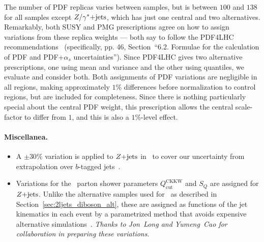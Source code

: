 The number of PDF replicas varies between samples, but is between
$100$ and $138$ for all samples except $Z/\gamma^*\mathrm{+jets}$, which has just one central
and two alternatives.
Remarkably, both SUSY and PMG prescriptions agree on how to assign variations
from these replica weights --- both say to follow the PDF4LHC
recommendations~\cite{PDF4LHC_Butterworth_2016} (specifically, pp. 46,
Section~``6.2. Formulae for the calculation of PDF and PDF+$\alpha_s$
uncertainties'').
Since PDF4LHC gives two alternative prescriptions, one using mean and variance
and the other using quantiles, we evaluate and consider both.
Both assignments of PDF variations are negligible in all regions, making
approximately $1\%$ differences before normalization to control regions, but are
included for completeness.
Since there is nothing particularly special about the central PDF weight,
this prescription allows the central scale-factor to differ from $1$,
and this is also a $1\%$-level effect.

\paragraph{Miscellanea.}
\begin{itemize}
\item A $\pm30\%$ variation is applied to $Z\mathrm{+jets}$ in \crtt\ to cover our
uncertainty from extrapolation over $b$-tagged
jets~\cite{atlas_twiki_susytheoretical}.
\item Variations for the \sherpa\ parton shower parameters
$Q_\textrm{cut}^\textrm{CKKW}$ and
$S_Q$ are assigned for $Z\mathrm{+jets}$.
Unlike the alternative samples used for \diboson\ as described in
Section~\ref{sec:2ljets_diboson_alt}, these are assigned as functions of the
jet kinematics in each event by a parametrized method that avoids expensive
alternative simulations~\cite{Anders:2125718, atlas_twiki_susytheoretical}.
\emph{Thanks to Jon~Long and Yumeng~Cao for collaboration in preparing these
variations}.
\end{itemize}


